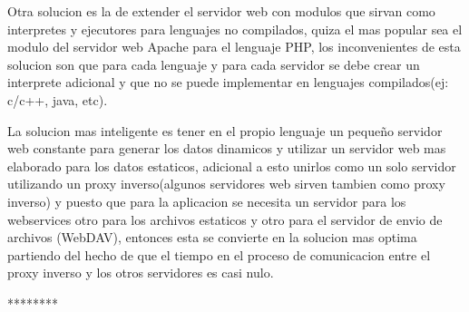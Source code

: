 Otra solucion es la de extender el servidor web con modulos que sirvan como interpretes y ejecutores para lenguajes no compilados, quiza el mas popular sea el modulo del servidor web Apache para el lenguaje PHP, los inconvenientes de esta solucion son que para cada lenguaje y para cada servidor se debe crear un interprete adicional y que no se puede implementar en lenguajes compilados(ej: c/c++, java, etc).

La solucion mas inteligente es tener en el propio lenguaje un pequeño servidor web constante para generar los datos dinamicos y utilizar un servidor web mas elaborado para los datos estaticos, adicional a esto unirlos como un solo servidor utilizando un proxy inverso(algunos servidores web sirven tambien como proxy inverso) y puesto que para la aplicacion se necesita un servidor para los webservices otro para los archivos estaticos y otro para el servidor de envio de archivos (WebDAV), entonces esta se convierte en la solucion mas optima partiendo del hecho de que el tiempo en el proceso de comunicacion entre el proxy inverso y los otros servidores es casi nulo.

********


